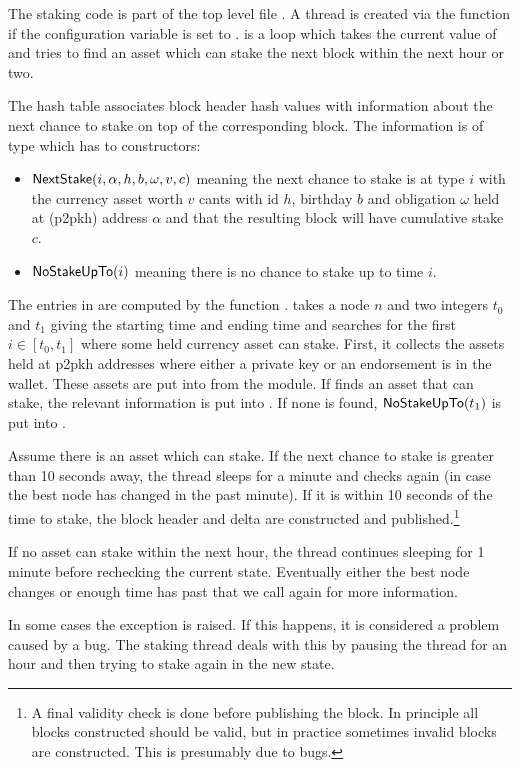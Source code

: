 The staking code is part of the top level file {}.
A thread is created via the function {}
if the configuration variable {} is set to {}.
{} is a loop which takes the current
value of {} and tries to find an asset which
can stake the next block within the next hour or two.

The hash table {} associates block header hash values with
information about the next chance to stake on top of the corresponding block.
The information is of type {} which has to constructors:
\begin{itemize}
\item ${\constr{NextStake}}(i,\alpha,h,b,\omega,v,c)$ meaning the next chance to stake
is at type $i$ with the currency asset worth $v$ cants with id $h$, birthday $b$ and obligation $\omega$ held at (p2pkh) address $\alpha$
and that the resulting block will have cumulative stake $c$.
\item ${\constr{NoStakeUpTo}}(i)$ meaning there is no chance to stake up to time $i$.
\end{itemize}
The entries in {} are computed
by the function {}.
{} takes a {} node $n$ 
and two integers $t_0$ and $t_1$ giving the starting time and ending time and searches for the first
$i\in [t_0,t_1]$ where some held currency asset can stake.
First, it collects the assets held at p2pkh addresses where either a private key
or an endorsement is in the wallet. These assets are put into {}
from the {} module.
If {} finds an asset that can stake, the relevant information is put into {}.
If none is found, ${\constr{NoStakeUpTo}}(t_1)$ is put into {}.

Assume there is an asset which can stake.
If the next chance to stake is greater than 10 seconds away, the thread sleeps for a minute
and checks again (in case the best node has changed in the past minute).
If it is within 10 seconds of the time to stake, the block header and delta are constructed
and published.\footnote{A final validity check is done before publishing the block. In principle
all blocks constructed should be valid, but in practice sometimes invalid blocks are constructed.
This is presumably due to bugs.}

If no asset can stake within the next hour, the thread continues sleeping for 1 minute
before rechecking the current state. Eventually either the best node changes or
enough time has past that we call {} again for more information.

In some cases the exception {} is raised. If this happens,
it is considered a problem caused by a bug. The staking thread deals with this by pausing
the thread for an hour and then trying to stake again in the new state.
